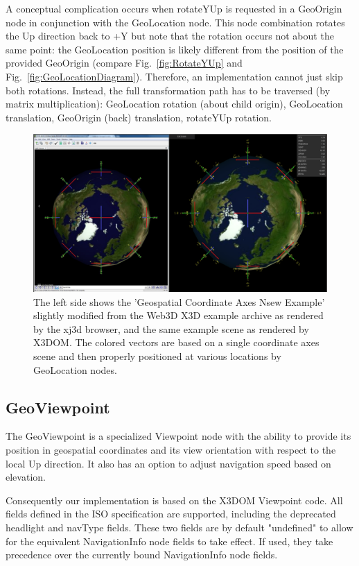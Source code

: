 \documentclass[review]{acmsiggraph}            %
\begin{document}
A conceptual complication occurs when rotateYUp is requested in a GeoOrigin node in conjunction with
the GeoLocation node. This node combination rotates the Up direction back to +Y but note that the rotation occurs
not about the same point: the GeoLocation position is likely different from the position of the
provided GeoOrigin (compare Fig.~\ref{fig:RotateYUp} and Fig.~\ref{fig:GeoLocationDiagram}).
Therefore, an implementation cannot just skip both rotations. Instead, the full transformation path
has to be traversed (by matrix multiplication): GeoLocation rotation (about child origin),
GeoLocation translation, GeoOrigin (back) translation, rotateYUp rotation.

\begin{figure}[htbp] \centering \includegraphics[width=6.6in]{Axes_NSEW.png} \caption{The left side
  shows the 'Geospatial Coordinate Axes Nsew Example' slightly modified from the Web3D X3D example
archive as rendered by the xj3d browser, and the same example scene as rendered by X3DOM. The
colored vectors are based on a single coordinate axes scene and then properly positioned at various
locations by GeoLocation nodes.} \label{fig:Axes_NSEW.png} \end{figure}

\subsection{GeoViewpoint}

The GeoViewpoint is a specialized Viewpoint node with the ability to provide its position in
geospatial coordinates and its view orientation with respect to the local Up direction. It also has
an option to adjust navigation speed based on elevation.

Consequently our implementation is based on the X3DOM Viewpoint code. All fields defined in the ISO
specification are supported, including the deprecated headlight and navType fields. These two fields
are by default "undefined" to allow for the equivalent NavigationInfo node fields to take effect. If
used, they take precedence over the currently bound NavigationInfo node fields.
\end{document}
